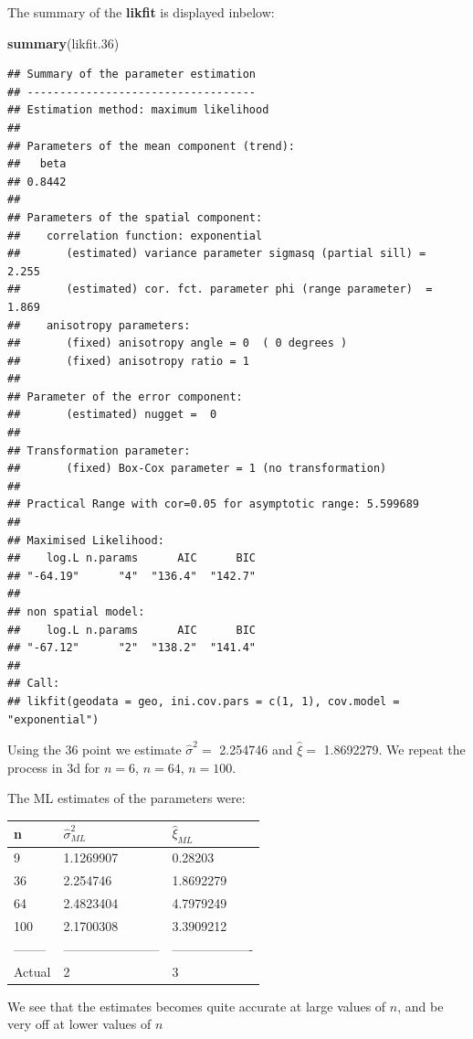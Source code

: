 \documentclass[]{article}
\newenvironment{Shaded}{\begin{snugshade}}{\end{snugshade}}
\newcommand{\FloatTok}[1]{\textcolor[rgb]{0.00,0.00,0.81}{#1}}
\newcommand{\KeywordTok}[1]{\textcolor[rgb]{0.13,0.29,0.53}{\textbf{#1}}}
\newcommand{\NormalTok}[1]{#1}
\begin{document}
The summary of the \textbf{likfit} is displayed inbelow:

\begin{Shaded}
\begin{Highlighting}[]
\KeywordTok{summary}\NormalTok{(likfit}\FloatTok{.36}\NormalTok{)}
\end{Highlighting}
\end{Shaded}

\begin{verbatim}
## Summary of the parameter estimation
## -----------------------------------
## Estimation method: maximum likelihood 
## 
## Parameters of the mean component (trend):
##   beta 
## 0.8442 
## 
## Parameters of the spatial component:
##    correlation function: exponential
##       (estimated) variance parameter sigmasq (partial sill) =  2.255
##       (estimated) cor. fct. parameter phi (range parameter)  =  1.869
##    anisotropy parameters:
##       (fixed) anisotropy angle = 0  ( 0 degrees )
##       (fixed) anisotropy ratio = 1
## 
## Parameter of the error component:
##       (estimated) nugget =  0
## 
## Transformation parameter:
##       (fixed) Box-Cox parameter = 1 (no transformation)
## 
## Practical Range with cor=0.05 for asymptotic range: 5.599689
## 
## Maximised Likelihood:
##    log.L n.params      AIC      BIC 
## "-64.19"      "4"  "136.4"  "142.7" 
## 
## non spatial model:
##    log.L n.params      AIC      BIC 
## "-67.12"      "2"  "138.2"  "141.4" 
## 
## Call:
## likfit(geodata = geo, ini.cov.pars = c(1, 1), cov.model = "exponential")
\end{verbatim}

Using the 36 point we estimate \(\hat\sigma^2 =\) 2.254746 and
\(\hat \xi =\) 1.8692279. We repeat the process in 3d for \(n=6\),
\(n=64\), \(n=100\).

\newpage

The ML estimates of the parameters were:

\begin{longtable}[]{@{}lll@{}}
\toprule
n & \(\hat \sigma^2_{ML}\) & \(\hat\xi_{ML}\)\tabularnewline
\midrule
\endhead
9 & 1.1269907 & 0.28203\tabularnewline
36 & 2.254746 & 1.8692279\tabularnewline
64 & 2.4823404 & 4.7979249\tabularnewline
100 & 2.1700308 & 3.3909212\tabularnewline
-------- & ----------------------- & -------------------\tabularnewline
Actual & 2 & 3\tabularnewline
\bottomrule
\end{longtable}

We see that the estimates becomes quite accurate at large values of
\(n\), and be very off at lower values of \(n\)
\end{document}
